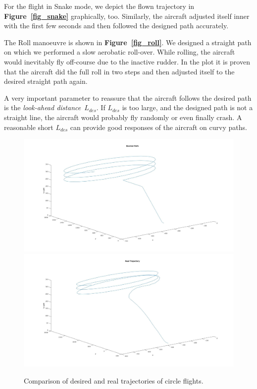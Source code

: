 \documentclass[11pt,a4paper]{scrartcl}		%
\begin{document}
\medskip

For the flight in Snake mode, we depict the flown trajectory in \textbf{Figure~\ref{fig_snake}} graphically, too. Similarly, the aircraft adjusted itself inner with the first few seconds and then followed the designed path accurately.

\medskip

The Roll manoeuvre is shown in \textbf{Figure~\ref{fig_roll}}. We designed a straight path on which we performed a slow aerobatic roll-over. While rolling, the aircraft would inevitably fly off-course due to the inactive rudder. 
In the plot it is proven that the aircraft did the full roll in two steps and then adjusted itself to the desired straight path again.

\bigskip

A very important parameter to reassure that the aircraft follows the desired path is the \textsl{look-ahead distance}~$L_{des}$. 
If $L_{des}$ is too large, and the designed path is not a straight line, the aircraft would probably fly randomly or even finally crash. 
A reasonable short $L_{des}$ can provide good responses of the aircraft on curvy paths.

\begin{figure}[!h]
  \centering
  	\includegraphics[width=16cm]{pictures/Results/Circle-desired.jpg}
  	\includegraphics[width=16cm]{pictures/Results/Circle-real.jpg}
  \caption{Comparison of desired and real trajectories of circle flights.}
  \label{fig_circle}
\end{figure}
\end{document}
